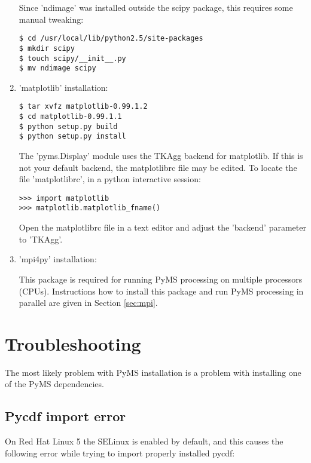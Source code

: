 \begin{enumerate}
\noindent
Since 'ndimage' was installed outside the scipy package, this requires
some manual tweaking:

\begin{verbatim}
$ cd /usr/local/lib/python2.5/site-packages
$ mkdir scipy
$ touch scipy/__init__.py
$ mv ndimage scipy
\end{verbatim}

\item 'matplotlib' installation:

\begin{verbatim}
$ tar xvfz matplotlib-0.99.1.2
$ cd matplotlib-0.99.1.1
$ python setup.py build
$ python setup.py install
\end{verbatim}

\noindent
The 'pyms.Display' module uses the TKAgg backend for matplotlib. If
this is not your default backend, the matplotlibrc file may be edited.
To locate the file 'matplotlibrc', in a python interactive session:

\begin{verbatim}
>>> import matplotlib
>>> matplotlib.matplotlib_fname()
\end{verbatim}

\noindent
Open the matplotlibrc file in a text editor and adjust the 'backend'
parameter to 'TKAgg'.

\item 'mpi4py' installation:

This package is required for running PyMS processing on multiple processors
(CPUs). Instructions how to install this package and run PyMS processing
in parallel are given in Section \ref{sec:mpi}. 


\end{enumerate}


\section{Troubleshooting}

The most likely problem with PyMS installation is a problem with
installing one of the PyMS dependencies.

\subsection{Pycdf import error}

On Red Hat Linux 5 the SELinux is enabled by default, and this causes the
following error while trying to import properly installed pycdf:

